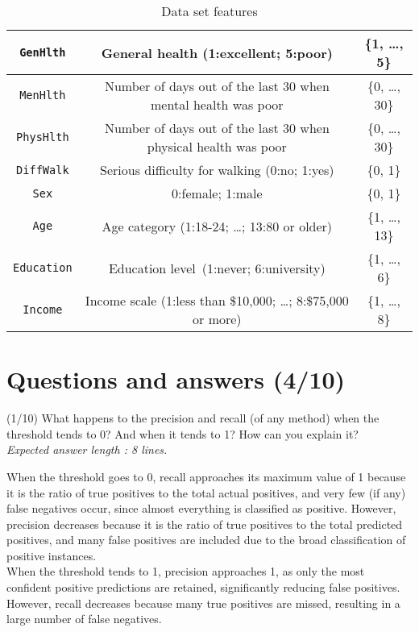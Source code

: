 \documentclass [a4paper, 11pt] {article}
\begin{document}
\begin{table}[htpb]
\begin{tabular}{|c|c|c|}
\hline
\texttt{GenHlth} & General health (1:excellent; 5:poor) & \{1, \dots, 5\} \\ 
\hline
\texttt{MenHlth} & Number of days out of the last 30 when mental health was poor & \{0, \dots, 30\} \\ 
\hline
\texttt{PhysHlth} & Number of days out of the last 30 when physical health was poor & \{0, \dots, 30\} \\ 
\hline
\texttt{DiffWalk} & Serious difficulty for walking (0:no; 1:yes) & \{0, 1\} \\ 
\hline
\texttt{Sex} & 0:female; 1:male & \{0, 1\} \\ 
\hline
\texttt{Age} & Age category (1:18-24; \dots; 13:80 or older) & \{1, \dots, 13\} \\ 
\hline
\texttt{Education} & Education level~(1:never; 6:university) & \{1, \dots, 6\} \\ 
\hline
\texttt{Income} & Income scale (1:less than \$10,000; \dots; 8:\$75,000 or more) & \{1, \dots, 8\} \\
\hline
    \end{tabular}
    \caption{Data set features}
    \label{tab:featuresList}
\end{table}
\clearpage
\section{Questions and answers (4/10)}

\begin{question}{2.1}
(1/10) What happens to the precision and recall (of any method) when the threshold tends to
0? And when it tends to 1? How can you explain it?\\
\textit{Expected answer length : 8 lines.}
\end{question}
\begin{answer}\color{blue} 
When the threshold goes to 0, recall approaches its maximum value of 1 because it is the ratio of true positives to the total actual positives, and very few (if any) false negatives occur, since almost everything is classified as positive. However, precision decreases because it is the ratio of true positives to the total predicted positives, and many false positives are included due to the broad classification of positive instances.\\

When the threshold tends to 1, precision approaches 1, as only the most confident positive predictions are retained, significantly reducing false positives. However, recall decreases because many true positives are missed, resulting in a large number of false negatives.
\end{answer}
\end{document}
